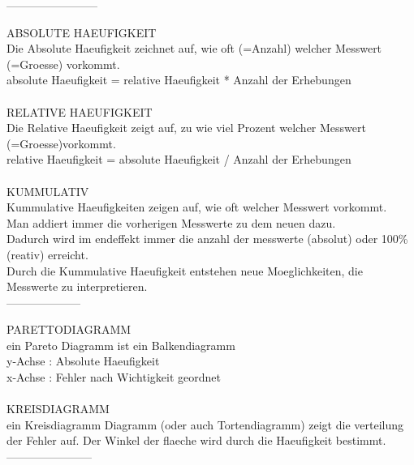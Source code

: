 \documentclass[12pt]{article}
\begin{document}
------------------------

ABSOLUTE HAEUFIGKEIT \\
    Die Absolute Haeufigkeit zeichnet auf, wie oft (=Anzahl) welcher Messwert (=Groesse) vorkommt. \\
        absolute Haeufigkeit = relative Haeufigkeit * Anzahl der Erhebungen
        \\ \\

RELATIVE HAEUFIGKEIT \\
    Die Relative Haeufigkeit zeigt auf, zu wie viel Prozent welcher Messwert (=Groesse)vorkommt. \\
        relative Haeufigkeit = absolute Haeufigkeit / Anzahl der Erhebungen \\ \\

KUMMULATIV \\
    Kummulative Haeufigkeiten zeigen auf, wie oft welcher Messwert vorkommt. \\
    Man addiert immer die vorherigen Messwerte zu dem neuen dazu.  \\
    Dadurch wird im endeffekt immer die anzahl der messwerte (absolut) oder 100\% (reativ) erreicht. \\
    Durch die Kummulative Haeufigkeit entstehen neue Moeglichkeiten, die Messwerte zu interpretieren. \\

--------------------

PARETTODIAGRAMM \\
    ein Pareto Diagramm ist ein Balkendiagramm \\
    y-Achse : Absolute Haeufigkeit \\
    x-Achse : Fehler nach Wichtigkeit geordnet \\ \\

KREISDIAGRAMM      \\
    ein Kreisdiagramm Diagramm (oder auch Tortendiagramm) zeigt die verteilung der Fehler auf.
        Der Winkel der flaeche wird durch die Haeufigkeit bestimmt. \\

-----------------------
\end{document}
